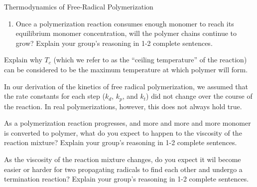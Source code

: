 \begin{activity}{Thermodynamics of Free-Radical Polymerization}
\begin{ctqs}
\begin{enumerate}
			\item Once a polymerization reaction consumes enough monomer to reach its equilibrium monomer concentration, will the polymer chains continue to grow?  Explain your group's reasoning in 1-2 complete sentences.
				
				\begin{solution}[1.5in]
				\end{solution}
				
		\end{enumerate}

	\question Explain why $T_c$ (which we refer to as the ``ceiling temperature'' of the reaction) can be considered to be the maximum temperature at which polymer will form.
				
				\begin{solution}[1.5in]
				\end{solution}

\end{ctqs}



\begin{model}
\label{\labelbase:mdl:rxnrates}

	In our derivation of the kinetics of free radical polymerization, we assumed that the rate constants for each step ($k_d$, $k_p$, and $k_t$) did not change over the course of the reaction.  In real polymerizations, however, this does not always hold true.

\end{model}

\begin{ctqs}

	\question As a polymerization reaction progresses, and more and more and more monomer is converted to polymer, what do you expect to happen to the viscosity of the reaction mixture?  Explain your group's reasoning in 1-2 complete sentences.
	
		\begin{solution}[2in]
		\end{solution}
		
	\question As the viscosity of the reaction mixture changes, do you expect it wil become easier or harder for two propagating radicals to find each other and undergo a termination reaction?  Explain your group's reasoning in 1-2 complete sentences.
	
		\begin{solution}[1.5in]
		\end{solution}
	

\end{ctqs}
\end{activity}

